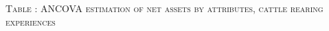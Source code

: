 \vspace{-1cm}\hspace{-1cm}\begin{minipage}[t]{14cm}
\hfil\textsc{\normalsize Table \thetable: ANCOVA estimation of net assets by attributes, cattle rearing experiences\label{tab ANCOVA narrow net assets Experience attributes 1}}\\
\setlength{\tabcolsep}{1pt}
\setlength{\baselineskip}{8pt}
\renewcommand{\arraystretch}{.52}
\hfil{}\\
\end{minipage}

